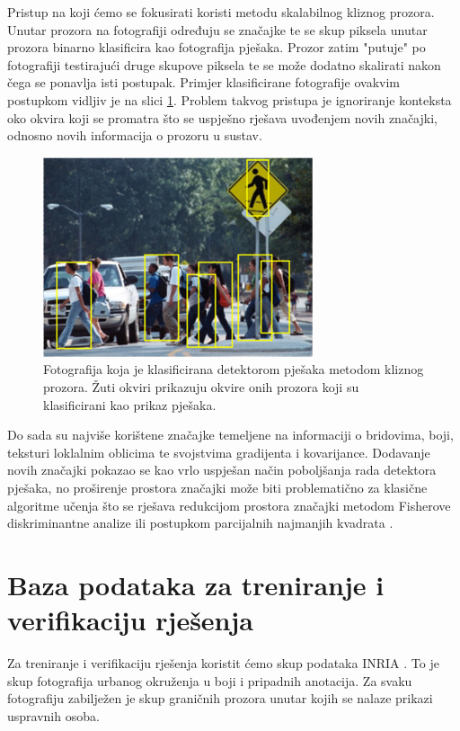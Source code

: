 \documentclass[seminar]{fer}
\begin{document}
Pristup na koji ćemo se fokusirati koristi metodu skalabilnog kliznog prozora. Unutar prozora na fotografiji određuju se značajke te se skup piksela unutar prozora binarno klasificira kao fotografija pješaka. Prozor zatim "putuje" po fotografiji testirajući druge skupove piksela te se može dodatno skalirati nakon čega se ponavlja isti postupak. Primjer klasificirane fotografije ovakvim postupkom vidljiv je na slici \ref{primjer_klasifikacije}. Problem takvog pristupa je ignoriranje konteksta oko okvira koji se promatra što se uspješno rješava uvođenjem novih značajki, odnosno novih informacija o prozoru u sustav.
\begin{figure}
\center
\includegraphics[scale=0.7]{img/crossing.png}
\caption{Fotografija koja je klasificirana detektorom pješaka metodom kliznog prozora. Žuti okviri prikazuju okvire onih prozora koji su klasificirani kao prikaz pješaka.}
\label{primjer_klasifikacije}
\end{figure}

Do sada su najviše korištene značajke temeljene na informaciji o bridovima, boji, teksturi loklalnim oblicima te svojstvima gradijenta i kovarijance. Dodavanje novih značajki pokazao se kao vrlo uspješan način poboljšanja rada detektora pješaka, no proširenje prostora značajki može biti problematično za klasične algoritme učenja što se rješava redukcijom prostora značajki metodom Fisherove diskriminantne analize ili postupkom parcijalnih najmanjih kvadrata  \cite{Schwartz_humandetection}. 

\chapter{Baza podataka za treniranje i verifikaciju rješenja}

Za treniranje i verifikaciju rješenja koristit ćemo skup podataka INRIA \cite{DT05}. To je skup fotografija urbanog okruženja u boji i pripadnih anotacija. Za svaku fotografiju zabilježen je skup graničnih prozora  unutar kojih se nalaze prikazi uspravnih osoba. %
\end{document}
